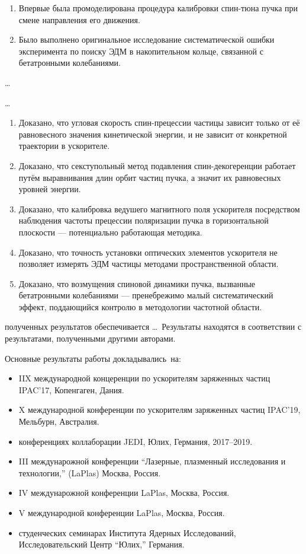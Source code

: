{\novelty}
\begin{enumerate}
  \item Впервые была промоделирована процедура калибровки спин-тюна пучка при смене направления его движения. 
  \item Было выполнено оригинальное исследование систематической ошибки эксперимента по поиску ЭДМ в накопительном кольце, связанной с бетатронными колебаниями.
\end{enumerate}

{\influence} \ldots

{\methods} \ldots

{}
\begin{enumerate}
  \item Доказано, что угловая скорость спин-прецессии частицы зависит только от её равновесного значения кинетической энергии, и не зависит от конкретной траектории в ускорителе.
  \item Доказано, что секступольный метод подавления спин-декогеренции работает путём выравнивания длин орбит частиц пучка, а значит их равновесных уровней энергии.
  \item Доказано, что калибровка ведушего магнитного поля ускорителя посредством наблюдения частоты прецессии поляризации пучка в горизонтальной плоскости --- потенциально работающая методика.
  \item Доказано, что точность установки оптических элементов ускорителя не позволяет измерять ЭДМ частицы методами пространственной области.
  \item Доказано, что возмущения спиновой динамики пучка, вызванные бетатронными колебаниями --- пренебрежимо малый систематический эффект, поддающийся контролю в методологии частотной области.
\end{enumerate}

{\reliability} полученных результатов обеспечивается \ldots \ Результаты находятся в соответствии с результатами, полученными другими авторами.


{\probation}
Основные результаты работы докладывались~на:
\begin{itemize}
\item IIX международной концеренции по ускорителям заряженных частиц IPAC'17, Копенгаген, Дания.
\item X международной конференции по ускорителям заряженных частиц IPAC'19, Мельбурн, Австралия.
\item конференциях коллаборации JEDI, Юлих, Германия, 2017--2019.
\item III междунарожной конференции ``Лазерные, плазменный исследования и технологии,'' (LaPlas) Москва, Россия. 
\item IV междунарожной конференции LaPlas, Москва, Россия.
\item V международной конференции LaPlas, Москва, Россия.
\item студенческих семинарах Института Ядерных Исследований, Исследовательский Центр ``Юлих,'' Германия.
\end{itemize}

